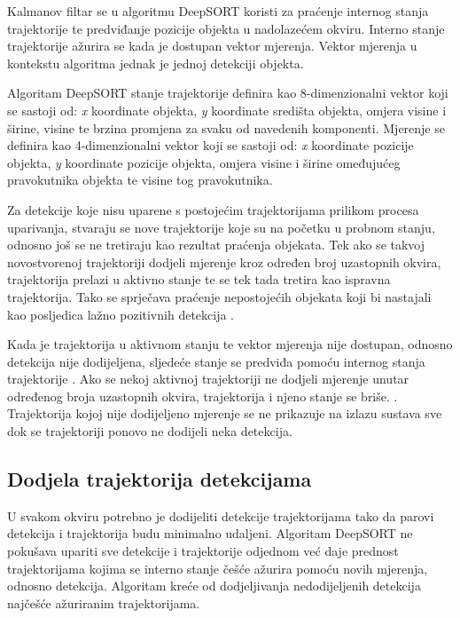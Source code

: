 \documentclass[times, utf8, seminar, numeric]{fer}
\begin{document}
Kalmanov filtar se u algoritmu DeepSORT koristi za praćenje internog stanja trajektorije te predviđanje pozicije objekta u nadolazećem okviru. Interno stanje trajektorije ažurira se kada je dostupan vektor mjerenja. Vektor mjerenja u kontekstu algoritma jednak je jednoj detekciji objekta. 

Algoritam DeepSORT stanje trajektorije definira kao 8-dimenzionalni vektor koji se sastoji od: \textit{x} koordinate objekta, \textit{y} koordinate središta objekta, omjera visine i širine, visine te brzina promjena za svaku od navedenih komponenti. Mjerenje se definira kao 4-dimenzionalni vektor koji se sastoji od: \textit{x} koordinate pozicije objekta, \textit{y} koordinate pozicije objekta, omjera visine i širine omeđujućeg pravokutnika objekta te visine tog pravokutnika. 


Za detekcije koje nisu uparene s postojećim trajektorijama prilikom procesa uparivanja, stvaraju se nove trajektorije koje su na početku u probnom stanju, odnosno još se ne tretiraju kao rezultat praćenja objekata. Tek ako se takvoj novostvorenoj trajektoriji dodjeli mjerenje kroz određen broj uzastopnih okvira, trajektorija prelazi u aktivno stanje te se tek tada tretira kao ispravna trajektorija. Tako se sprječava praćenje nepostojećih objekata koji bi nastajali kao posljedica lažno pozitivnih detekcija \cite{deepsort}.

Kada je trajektorija u aktivnom stanju te vektor mjerenja nije dostupan, odnosno detekcija nije dodijeljena, sljedeće stanje se predviđa pomoću internog stanja trajektorije \cite{sort}.
Ako se nekoj aktivnoj trajektoriji ne dodjeli mjerenje unutar određenog broja uzastopnih okvira, trajektorija i njeno stanje se briše. \cite{deepsort}.
Trajektorija kojoj nije dodijeljeno mjerenje se ne prikazuje na izlazu sustava sve dok se trajektoriji ponovo ne dodijeli neka detekcija.

\subsection{Dodjela trajektorija detekcijama}

U svakom okviru potrebno je dodijeliti detekcije trajektorijama tako da parovi detekcija i trajektorija budu minimalno udaljeni.
Algoritam DeepSORT ne pokušava upariti sve detekcije i trajektorije odjednom već daje prednost trajektorijama kojima se interno stanje češće ažurira pomoću novih mjerenja, odnosno detekcija. 
Algoritam kreće od dodjeljivanja nedodijeljenih detekcija najčešće ažuriranim trajektorijama. 
\end{document}
